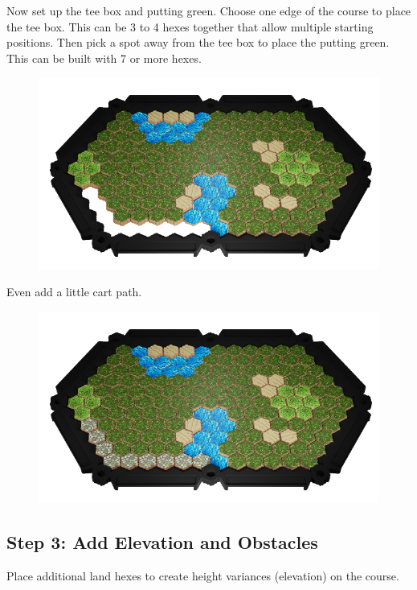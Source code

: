 \documentclass[../main.tex]{subfiles}
\begin{document}
Now set up the tee box and putting green. Choose one edge of the course to place the tee box. This can be 3 to 4 hexes together that allow multiple starting positions. Then pick a spot away from the tee box to place the putting green. This can be built with 7 or more hexes. 
\begin{figure}[h]
    \centering
    \includegraphics[width=1\linewidth]{chapters//boardsetup/Source Golf Base Layer.TeePuttingBox.png}
\end{figure}

Even add a little cart path. 
\begin{figure}[h]
    \centering
    \includegraphics[width=1\linewidth]{chapters//boardsetup/Source Golf Base Layer.CartPath.png}
\end{figure}

\subsection{Step 3: Add Elevation and Obstacles}
Place additional land hexes to create height variances (elevation) on the course. 
 
\end{document}
